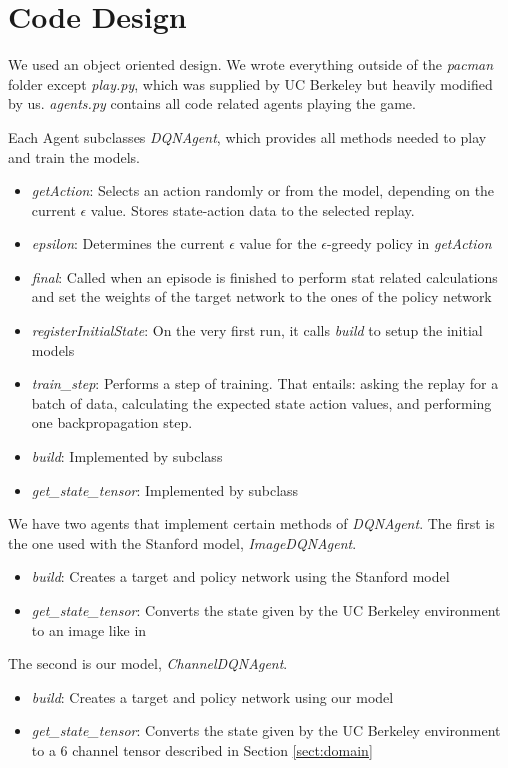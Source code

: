 \documentclass[conference]{IEEEtran}
\begin{document}
\section{Code Design}

We used an object oriented design. We wrote everything outside of the \textit{pacman} folder except \textit{play.py}, which was supplied by UC Berkeley but heavily modified by us. \textit{agents.py} contains all code related agents playing the game.

Each Agent subclasses \textit{DQNAgent}, which provides all methods needed to play and train the models.
\begin{itemize}
  \item \textit{getAction}: Selects an action randomly or from the model, depending on the current $\epsilon$ value. Stores state-action data to the selected replay.
  \item \textit{epsilon}: Determines the current $\epsilon$ value for the $\epsilon$-greedy policy in \textit{getAction}
  \item \textit{final}: Called when an episode is finished to perform stat related calculations and set the weights of the target network to the ones of the policy network
  \item \textit{registerInitialState}: On the very first run, it calls \textit{build} to setup the initial models
  \item \textit{train\_step}: Performs a step of training. That entails: asking the replay for a batch of data, calculating the expected state action values, and performing one backpropagation step.
  \item \textit{build}: Implemented by subclass
  \item \textit{get\_state\_tensor}: Implemented by subclass
\end{itemize}

We have two agents that implement certain methods of \textit{DQNAgent}. The first is the one used with the Stanford model, \textit{ImageDQNAgent}.
\begin{itemize}
    \item \textit{build}: Creates a target and policy network using the Stanford model
    \item \textit{get\_state\_tensor}: Converts the state given by the UC Berkeley environment to an image like in \cite{stanford2017}
\end{itemize}
The second is our model, \textit{ChannelDQNAgent}.
\begin{itemize}
    \item \textit{build}: Creates a target and policy network using our model
    \item \textit{get\_state\_tensor}: Converts the state given by the UC Berkeley environment to a 6 channel tensor described in Section \ref{sect:domain}
\end{itemize}
\end{document}
